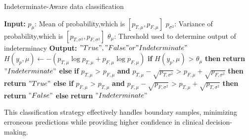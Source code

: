 \begin{algorithm}[H]
\caption{Indeterminate-Aware data classification}
\label{alg:Training}
\begin{algorithmic}[1]
\Statex \textbf{Input:} 
\Statex \hspace{1em} \(p_{\mu}\): Mean of probability,which is \([p_{T,\mu},p_{F,\mu}]\)
\Statex \hspace{1em} \(p_{\sigma^2}\): Variance of probability,which is \([p_{T,\sigma^2},p_{F,\sigma^2}]\)
\Statex \hspace{1em} \(\theta_{\mu}\): Threshold used to determine output of indeterminacy
\Statex \textbf{Output:} 
\Statex \hspace{1em} \("True", "False" or "Indeterminate"\)
\State \(H(y_p,\mu) \leftarrow -(p_{T,\mu}\log p_{T,\mu}+p_{F,\mu}\log p_{F,\mu})\) 
\State \textbf{if} \(H(y_p,\mu)\) > \(\theta_{\mu}\) \textbf{then}
\State \hspace{1em} \textbf{return} \("Indeterminate"\)
\State \textbf{else}
\State \hspace{1em} \textbf{if} \(p_{T,\mu}\) > \(p_{F,\mu}\) \textbf{and} \(p_{T,\mu} - \sqrt{p_{T,\sigma^2}}\) > \( p_{F,\mu} + \sqrt{p_{F,\sigma^2}}\) \textbf{then}
\State \hspace{2em} \textbf{return} \("True"\)
\State \hspace{1em} \textbf{else if} \(p_{F,\mu}\) > \(p_{T,\mu}\) \textbf{and} \(p_{F,\mu} - \sqrt{p_{F,\sigma^2}}\) > \( p_{T,\mu} + \sqrt{p_{T,\sigma^2}}\) \textbf{then}
\State \hspace{2em} \textbf{return} \("False"\)
\State \hspace{1em} \textbf{else}
\State \hspace{2em} \textbf{return} \("Indeterminate"\)
\end{algorithmic}
\end{algorithm}

This classification strategy effectively handles boundary samples, minimizing erroneous predictions while providing higher confidence in clinical decision-making.

